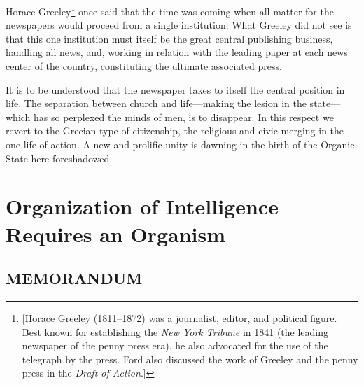 \documentclass[openany,nobib]{tufte-book}
\let\oldchapter\chapter
\def\chapter{%
  \setcounter{footnote}{0}%
  \oldchapter
}
\begin{document}
Horace Greeley\footnote{{[}Horace Greeley (1811--1872) was a journalist,
  editor, and political figure. Best known for establishing the
  \emph{New York Tribune} in 1841 (the leading newspaper of the penny
  press era), he also advocated for the use of the telegraph by the
  press. Ford also discussed the work of Greeley and the penny press in
  the \emph{Draft of Action}.{]}} once said that the time was coming
when all matter for the newspapers would proceed from a single
institution. What Greeley did not see is that this one institution must
itself be the great central publishing business, handling all news, and,
working in relation with the leading paper at each news center of the
country, constituting the ultimate associated press.~

It is to be understood that the newspaper takes to itself the central
position in life. The separation between church and life---making the
lesion in the state---which has so perplexed the minds of men, is to
disappear. In this respect we revert to the Grecian type of citizenship,
the religious and civic merging in the one life of action. A new and
prolific unity is dawning in the birth of the Organic State here
foreshadowed.~


\chapter[Organization of Intelligence Requires an Organism]{Organization of Intelligence Requires an Organism}
\label{ch:Organization of Intelligence Requires an Organism}

\vspace{.2in}

\begin{LARGE}
    

\end{LARGE}

\vspace{0.5in}


    

\hypertarget{memorandum}{%
\section{MEMORANDUM}\label{memorandum}}
\end{document}
